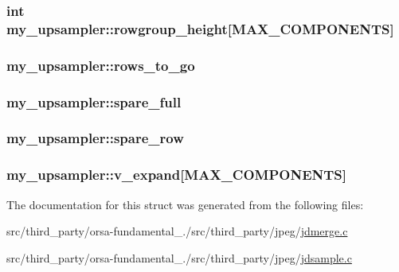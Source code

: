 \subsubsection[{rowgroup\+\_\+height}]{\setlength{\rightskip}{0pt plus 5cm}int my\+\_\+upsampler\+::rowgroup\+\_\+height\mbox{[}{\bf M\+A\+X\+\_\+\+C\+O\+M\+P\+O\+N\+E\+N\+T\+S}\mbox{]}}\label{structmy__upsampler_a05806e1394a2638e4912da137b9d4bcd}
\hypertarget{structmy__upsampler_a1a6b9998ad6a7501dd5287295fd8adc4}{}
\subsubsection[{rows\+\_\+to\+\_\+go}]{ my\+\_\+upsampler\+::rows\+\_\+to\+\_\+go}\label{structmy__upsampler_a1a6b9998ad6a7501dd5287295fd8adc4}
\hypertarget{structmy__upsampler_a98ee90ab9a83d6d1c16c073826c34e51}{}
\subsubsection[{spare\+\_\+full}]{ my\+\_\+upsampler\+::spare\+\_\+full}\label{structmy__upsampler_a98ee90ab9a83d6d1c16c073826c34e51}
\hypertarget{structmy__upsampler_a000b6953c558f05f68e56c2c08c12902}{}
\subsubsection[{spare\+\_\+row}]{ my\+\_\+upsampler\+::spare\+\_\+row}\label{structmy__upsampler_a000b6953c558f05f68e56c2c08c12902}
\hypertarget{structmy__upsampler_a48df5e8df66ba2f1275f54a617eaf888}{}
\subsubsection[{v\+\_\+expand}]{ my\+\_\+upsampler\+::v\+\_\+expand\mbox{[}{\bf M\+A\+X\+\_\+\+C\+O\+M\+P\+O\+N\+E\+N\+T\+S}\mbox{]}}\label{structmy__upsampler_a48df5e8df66ba2f1275f54a617eaf888}


The documentation for this struct was generated from the following files\+:\begin{DoxyCompactItemize}
\item 
src/third\+\_\+party/orsa-\/fundamental\+\_./src/third\+\_\+party/jpeg/\hyperlink{jdmerge_8c}{jdmerge.\+c}\item 
src/third\+\_\+party/orsa-\/fundamental\+\_./src/third\+\_\+party/jpeg/\hyperlink{jdsample_8c}{jdsample.\+c}\end{DoxyCompactItemize}

